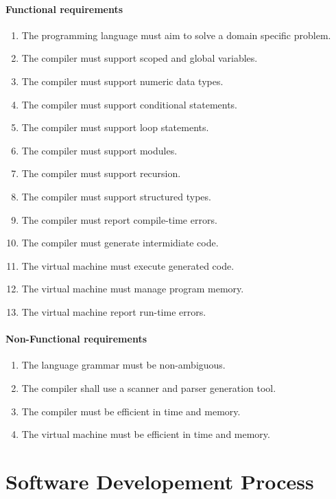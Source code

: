 \paragraph{Functional requirements}
\begin{enumerate}
    \item The programming language must aim to solve a domain specific problem.
    \item The compiler must support scoped and global variables.
    \item The compiler must support numeric data types.
    \item The compiler must support conditional statements.
    \item The compiler must support loop statements.
    \item The compiler must support modules.
    \item The compiler must support recursion.
    \item The compiler must support structured types.
    \item The compiler must report compile-time errors.
    \item The compiler must generate intermidiate code.
    \item The virtual machine must execute generated code.
    \item The virtual machine must manage program memory.
    \item The virtual machine report run-time errors.
\end{enumerate}

\paragraph{Non-Functional requirements}
\begin{enumerate}
    \item The language grammar must be non-ambiguous.
    \item The compiler shall use a scanner and parser generation tool.
    \item The compiler must be efficient in time and memory.
    \item The virtual machine must be efficient in time and memory.
\end{enumerate}

\newpage

\section{Software Developement Process}

